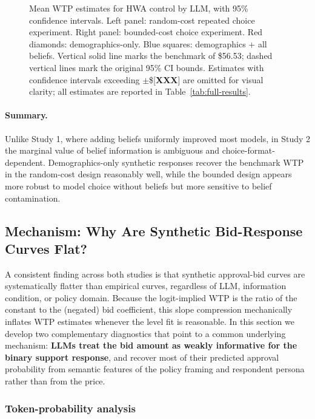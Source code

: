 \documentclass[12pt]{article}
\begin{document}
\begin{figure}[h]
    \centering
    \caption{Mean WTP estimates for HWA control by LLM, with 95\% confidence intervals. Left panel: random-cost repeated choice experiment. Right panel: bounded-cost choice experiment. Red diamonds: demographics-only. Blue squares: demographics + all beliefs. Vertical solid line marks the \textcite{Giguere2020} benchmark of \$56.53; dashed vertical lines mark the original 95\% CI bounds. Estimates with confidence intervals exceeding $\pm$\$[\textbf{XXX}] are omitted for visual clarity; all estimates are reported in Table~\ref{tab:full-results}.}
    \label{fig:hwa-wtp}
\end{figure}

\paragraph{Summary.} Unlike Study 1, where adding beliefs uniformly improved most models, in Study 2 the marginal value of belief information is ambiguous and choice-format-dependent. Demographics-only synthetic responses recover the benchmark WTP in the random-cost design reasonably well, while the bounded design appears more robust to model choice without beliefs but more sensitive to belief contamination.

\subsection{Mechanism: Why Are Synthetic Bid-Response Curves Flat?}\label{sec:results-mechanism}

A consistent finding across both studies is that synthetic approval-bid curves are systematically flatter than empirical curves, regardless of LLM, information condition, or policy domain. Because the logit-implied WTP is the ratio of the constant to the (negated) bid coefficient, this slope compression mechanically inflates WTP estimates whenever the level fit is reasonable. In this section we develop two complementary diagnostics that point to a common underlying mechanism: \textbf{LLMs treat the bid amount as weakly informative for the binary support response}, and recover most of their predicted approval probability from semantic features of the policy framing and respondent persona rather than from the price.

\subsubsection{Token-probability analysis}
\end{document}
